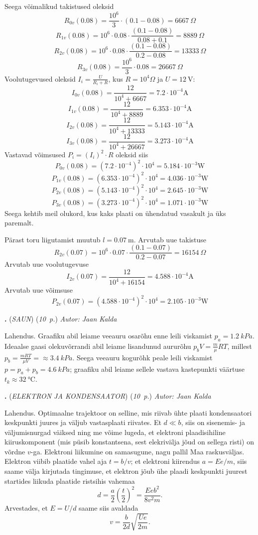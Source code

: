 \documentclass[11pt,a5paper]{article}
\newcommand{\numb}[1]{\vspace{5pt}\textbf{\large #1}}
\newcommand{\nimi}[1]{(\textsl{\small #1})}
\newcommand{\punktid}[1]{(\emph{#1~p.})}
\newcounter{ylesanne}
\newcommand{\yl}[1]{\addtocounter{ylesanne}{1}\numb{\theylesanne.} \nimi{#1} \newblock{}}
\newcommand{\autor}[1]{\emph{ Autor: #1}}%
\begin{document}
Seega võimalikud takistused oleksid
\[R_{0v}(0.08) = \frac{10^6}{3} \cdot (0.1-0.08) = \SI{6667}{\Omega}\]
\[R_{1v}(0.08) = 10^6 \cdot  0.08 \cdot \frac{(0.1-0.08)}{0.08+0.1} = \SI{8889}{\Omega}\]
\[R_{2v}(0.08) = 10^6 \cdot  0.08 \cdot  \frac{(0.1-0.08)}{0.2-0.08} = \SI{13333}{\Omega}\]
\[R_{3v}(0.08) = \frac{10^6}{3} \cdot 0.08 = \SI{26667}{\Omega}\]
Voolutugevused oleksid $I_i=\frac{U}{R_i  + R}$, kus $R = 10^4\si{\Omega}$ ja $U = \SI{12}{\volt}$:
\[ I_{0v}(0.08) = \frac{12}{10^4 + 6667} = 7.2 \cdot 10^{-4} \si{\ampere}\]
\[ I_{1v}(0.08) = \frac{12}{10^4 + 8889} = 6.353 \cdot 10^{-4} \si{\ampere}\]
\[ I_{2v}(0.08) = \frac{12}{10^4 + 13333} = 5.143 \cdot 10^{-4} \si{\ampere}\]
\[ I_{3v}(0.08) = \frac{12}{10^4 + 26667} = 3.273 \cdot 10^{-4} \si{\ampere}\]
Vastavad võimsused $P_i = (I_i)^2 \cdot R$ oleksid siis
\[ P_{0v}(0.08) = (7.2 \cdot 10^{-4})^2 \cdot 10^4 = 5.184 \cdot 10^{-3}  \si{\watt}\]
\[ P_{1v}(0.08) = (6.353 \cdot 10^{-4})^2 \cdot 10^4 = 4.036 \cdot 10^{-3}  \si{\watt}\]
\[ P_{2v}(0.08) = (5.143 \cdot 10^{-4})^2 \cdot 10^4 = 2.645 \cdot 10^{-3}  \si{\watt}\]
\[ P_{3v}(0.08) = (3.273 \cdot 10^{-4})^2 \cdot 10^4 = 1.071 \cdot 10^{-3}  \si{\watt}\]
Seega kehtib meil olukord, kus kaks plaati on ühendatud vasakult ja üks paremalt.

Pärast toru liigutamist muutub $l=\SI{0.07}{\meter} $.
Arvutab uue takistuse
\[ R_{2v}(0.07) =  10^6 \cdot 0.07 \cdot  \frac{(0.1-0.07)}{0.2-0.07} = \SI{16154}{\Omega} \]
Arvutab uue voolutugevuse
\[ I_{2v}(0.07) = \frac{12}{10^4 + 16154} = 4.588 \cdot 10^{-4} \si{\ampere}\]
Arvutab  uue võimsuse
\[ P_{2v}(0.07) = (4.588 \cdot 10^{-4})^2 \cdot 10^4 = 2.105 \cdot 10^{-3}  \si{\watt}\]



\yl{SAUN}
\punktid{10} \autor{Jaan Kalda}

Lahendus. Graafiku abil leiame veeauru osarõhu enne leili viskamist $p_a=\SI{1.2}{kPa}$. Ideaalse gaasi olekuvõrrandi abil leiame lisandunud aururõhu $p_bV=\frac m\mu RT$, millest $p_b=\frac {mRT}{\mu V}=\approx \SI{3.4}{kPa}$. Seega veeauru kogurõhk peale leili viskamist $p=p_a+p_b=\SI{4.6}{kPa}$; graafiku abil leiame sellele vastava kastepunkti väärtuse $t_k\approx \SI{32}\celsius$.




\yl{ELEKTRON JA KONDENSAATOR}
\punktid{10} \autor{Jaan Kalda}

Lahendus. Optimaalne trajektoor on selline, mis riivab ühte plaati kondensaatori keskpunkti juures ja väljub vastasplaati riivates. Et $d\ll b$, siis on sisenemis- ja väljumisnurgad väiksed ning me võime lugeda, et elektroni plaadisihiline kiiruskomponent (mis püsib konstantsena, sest elekrivälja jõud on sellega risti) on võrdne $v$-ga. Elektroni liikumine on samasugune, nagu pallil Maa raskusväljas. Elektron viibib plaatide vahel aja $t=b/v$; et elektroni kiirendus $a=Ee/m$, siis saame välja kirjutada tingimuse, et elektron jõub ühe plaadi keskpunkti juurest startides liikuda plaatide ristsihis vahemaa $$d=\frac a2\left(\frac t2\right)^2=\frac{Eeb^2}{8v^2m}.$$ Arvestades, et $E=U/d$ saame siis avaldada $$v=\frac b{2d}\sqrt{\frac{Ue}{2m}}.$$
\end{document}
